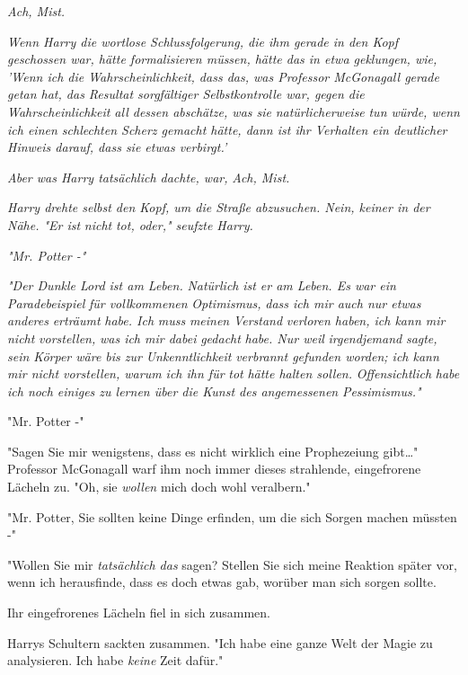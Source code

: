 {\emph{\emph{Ach, Mist.}}

\emph{Wenn Harry die wortlose Schlussfolgerung, die ihm gerade in den Kopf geschossen war, hätte formalisieren müssen, hätte das in etwa geklungen, wie, 'Wenn ich die Wahrscheinlichkeit, dass das, was Professor McGonagall gerade getan hat, das Resultat sorgfältiger Selbstkontrolle war, gegen die Wahrscheinlichkeit all dessen abschätze, was sie} \emph{\emph{natürlicherweise}} \emph{tun würde, wenn ich einen schlechten Scherz gemacht hätte, dann ist ihr Verhalten ein deutlicher Hinweis darauf, dass sie etwas verbirgt.'}

\emph{Aber was Harry tatsächlich dachte, war,} \emph{\emph{Ach, Mist.}}

\emph{Harry drehte selbst den Kopf, um die Straße abzusuchen. Nein, keiner in der Nähe. "Er ist} \emph{\emph{nicht}} \emph{tot, oder," seufzte Harry.}

\emph{"Mr. Potter -"}

\emph{"Der Dunkle Lord ist am Leben.} \emph{\emph{Natürlich}} \emph{ist er am Leben. Es war ein} \emph{\emph{Paradebeispiel}} \emph{für vollkommenen} \emph{\emph{Optimismus,}} \emph{dass ich mir auch nur etwas anderes} \emph{\emph{erträumt}} \emph{habe. Ich} \emph{\emph{muss}} \emph{meinen} \emph{\emph{Verstand}} \emph{verloren haben, ich kann mir nicht} \emph{\emph{vorstellen,}} \emph{was ich mir dabei} \emph{\emph{gedacht}} \emph{habe. Nur weil} \emph{\emph{irgendjemand}} \emph{sagte, sein Körper wäre bis zur} \emph{\emph{Unkenntlichkeit}} \emph{verbrannt gefunden worden; ich kann mir nicht vorstellen, warum ich ihn für} \emph{\emph{tot}} \emph{hätte halten sollen.} \emph{\emph{Offensichtlich}} \emph{habe ich noch einiges zu lernen über die Kunst des angemessenen} \emph{\emph{Pessimismus.}"}

"Mr. Potter -"

"Sagen Sie mir wenigstens, dass es nicht wirklich eine Prophezeiung gibt…" Professor McGonagall warf ihm noch immer dieses strahlende, eingefrorene Lächeln zu. "Oh, sie \emph{wollen} mich doch wohl veralbern."

"Mr. Potter, Sie sollten keine Dinge erfinden, um die sich Sorgen machen müssten -"

"Wollen Sie mir \emph{tatsächlich das} sagen? Stellen Sie sich meine Reaktion später vor, wenn ich herausfinde, dass es doch etwas gab, worüber man sich sorgen sollte.

Ihr eingefrorenes Lächeln fiel in sich zusammen.

Harrys Schultern sackten zusammen. "Ich habe eine ganze Welt der Magie zu analysieren. Ich habe \emph{keine} Zeit dafür."

}

